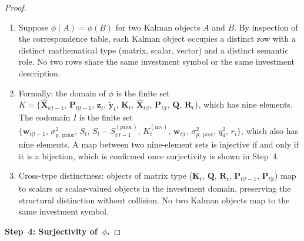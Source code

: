 \documentclass[12pt,openany]{book}
\numberwithin{equation}{chapter}
\theoremstyle{plain}
\theoremstyle{definition}
\theoremstyle{remark}
\def\mathcal#1{#1}%
\begin{document}
\begin{proof}
\begin{enumerate}
  \item Suppose $\phi(A) = \phi(B)$ for two Kalman objects $A$
        and $B$.  By inspection of the correspondence table, each
        Kalman object occupies a distinct row with a distinct
        mathematical type (matrix, scalar, vector) and a distinct
        semantic role.  No two rows share the same investment
        symbol or the same investment description.
  \item Formally: the domain of $\phi$ is the finite set
        $\mathcal{K} = \{\hat{\mathbf{X}}_{t|t-1},\,
        \mathbf{P}_{t|t-1},\, \mathbf{z}_t,\,
        \tilde{\mathbf{y}}_t,\, \mathbf{K}_t,\,
        \hat{\mathbf{X}}_{t|t},\, \mathbf{P}_{t|t},\,
        \mathbf{Q},\, \mathbf{R}_t\}$, which has nine elements.
        The codomain $\mathcal{I}$ is the finite set
        $\{\mathbf{w}_{t|t-1},\,\sigma_{p,\,\text{prior}}^2,\,
        S_t,\, S_t - S_{t|t-1}^{(\mathrm{prior})},\,
        K_t^{(\mathrm{inv})},\, \mathbf{w}_{t|t},\,
        \sigma_{p,\,\text{post}}^2,\, q_d^2,\, r_i\}$,
        which also has nine elements.  A map between two
        nine-element sets is injective if and only if it is a
        bijection, which is confirmed once surjectivity is shown
        in Step~4.
  \item Cross-type distinctness: objects of matrix type
        ($\mathbf{K}_t$, $\mathbf{Q}$, $\mathbf{R}_t$,
        $\mathbf{P}_{t|t-1}$, $\mathbf{P}_{t|t}$) map to
        scalars or scalar-valued objects in the investment domain,
        preserving the structural distinction without collision.
        No two Kalman objects map to the same investment symbol.
\end{enumerate}

\medskip
\noindent\textbf{Step~4: Surjectivity of~$\phi$.}


\end{proof}
\end{document}
